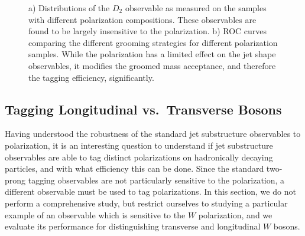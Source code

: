 \documentclass[11pt,letterpaper]{article}
\begin{document}
\begin{figure}
\begin{center}
\end{center}
\caption{a) Distributions of the $D_2$ observable as measured on the samples with different polarization compositions. These observables are found to be largely insensitive to the polarization. b) ROC curves comparing the different grooming strategies for different polarization samples. While the polarization has a limited effect on the jet shape observables, it modifies the groomed mass acceptance, and therefore the tagging efficiency, significantly.}\label{fig:polarization_roc}
\end{figure}

\subsection{Tagging Longitudinal vs.\ Transverse Bosons}\label{sec:polar_tag}

Having understood the robustness of the standard jet substructure observables to polarization, it is an interesting question to understand if jet substructure observables are able to tag distinct polarizations on hadronically decaying particles, and with what efficiency this can be done.
%
Since the standard two-prong tagging observables are not particularly sensitive to the polarization, a different observable must be used to tag polarizations.
%
In this section, we do not perform a comprehensive study, but restrict ourselves to studying a particular example of an observable which is sensitive to the $W$ polarization, and we evaluate its performance for distinguishing transverse and longitudinal $W$ bosons. 
\end{document}
